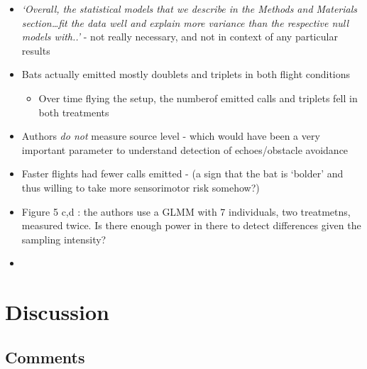 \documentclass[
]{book}
\providecommand{\tightlist}{%
  \setlength{\itemsep}{0pt}\setlength{\parskip}{0pt}}
\begin{document}
\begin{itemize}
\item
  \emph{`Overall, the statistical models that we describe in the Methods and Materials section\ldots fit the data well and explain more variance than the respective null models with..'} - not really necessary, and not in context of any particular results
\item
  Bats actually emitted mostly doublets and triplets in both flight conditions

  \begin{itemize}
  \tightlist
  \item
    Over time flying the setup, the numberof emitted calls and triplets fell in both treatments
  \end{itemize}
\item
  Authors \emph{do not} measure source level - which would have been a very important parameter to understand detection of echoes/obstacle avoidance
\item
  Faster flights had fewer calls emitted - (a sign that the bat is `bolder' and thus willing to take more sensorimotor risk somehow?)
\item
  Figure 5 c,d : the authors use a GLMM with 7 individuals, two treatmetns, measured twice. Is there enough power in there to detect differences given the sampling intensity?
\item
\end{itemize}

\hypertarget{discussion-6}{%
\section{Discussion}\label{discussion-6}}

\hypertarget{comments-10}{%
\subsection{Comments}\label{comments-10}}
\end{document}

